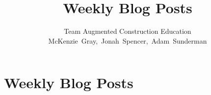 \documentclass[letterpaper, 10pt, onecolumn, draftclsnofoot]{IEEEtran}
\title{\Large{\textbf{Weekly Blog Posts}\\}}
\author{Team Augmented Construction Education \\
       McKenzie~Gray,~Jonah~Spencer,~Adam~Sunderman}
\begin{document}
\maketitle

\newpage
\tableofcontents
\clearpage
\newpage


\section{Weekly Blog Posts}
\end{document}
